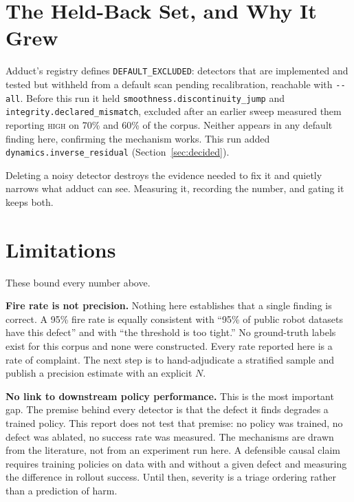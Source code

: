 \documentclass[10pt,a4paper]{article}
\newcommand{\dtr}[1]{\texttt{\small #1}}
\begin{document}
\section{The Held-Back Set, and Why It Grew}
\label{sec:excluded}

Adduct's registry defines \texttt{DEFAULT\_EXCLUDED}: detectors that are implemented and
tested but withheld from a default scan pending recalibration, reachable with
\texttt{-{}-all}. Before this run it held \dtr{smoothness.discontinuity\_jump} and
\dtr{integrity.declared\_mismatch}, excluded after an earlier sweep measured them reporting
\textsc{high} on 70\% and 60\% of the corpus. Neither appears in any default finding here,
confirming the mechanism works. This run added \dtr{dynamics.inverse\_residual}
(Section~\ref{sec:decided}).

Deleting a noisy detector destroys the evidence needed to fix it and quietly narrows what
adduct can see. Measuring it, recording the number, and gating it keeps both.

\section{Limitations}
\label{sec:limits}

These bound every number above.

\textbf{Fire rate is not precision.} Nothing here establishes that a single finding is
correct. A 95\% fire rate is equally consistent with ``95\% of public robot datasets have
this defect'' and with ``the threshold is too tight.'' No ground-truth labels exist for this
corpus and none were constructed. Every rate reported here is a rate of complaint. The next
step is to hand-adjudicate a stratified sample and publish a precision estimate with an
explicit $N$.

\textbf{No link to downstream policy performance.} This is the most important gap. The
premise behind every detector is that the defect it finds degrades a trained policy. This
report does not test that premise: no policy was trained, no defect was ablated, no success
rate was measured. The mechanisms are drawn from the literature, not from an experiment run
here. A defensible causal claim requires training policies on data with and without a given
defect and measuring the difference in rollout success. Until then, severity is a triage
ordering rather than a prediction of harm.
\end{document}
